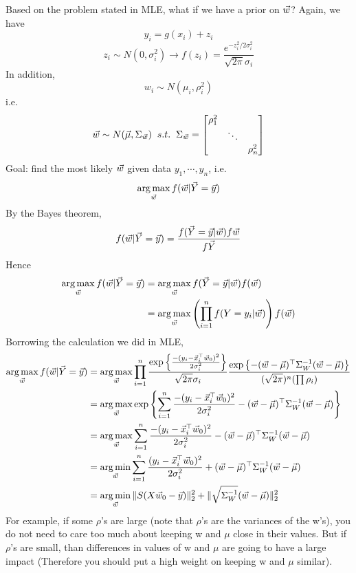 \begin{theorem}
	Based on the problem stated in MLE, what if we have a prior on $\vec{w}$? Again, we have
	\[
y_i = g(x_i)+z_i
	\]
	\[
z_i \sim N(0,\sigma_i^2) \rightarrow f(z_i) = \frac{e^{-z_i^2/2\sigma_i^2}}{\sqrt{2\pi}\sigma_i}
	\]
	In addition,
	\[
w_i \sim N(\mu_i,\rho_i^2)
	\]
	i.e.
	\[
\vec{w} \sim N(\vec{\mu}, \Sigma_{\vec{w}}) \;\; s.t.\;\; \Sigma_{\vec{w}} = \begin{bmatrix}
	\rho_1^2 &&\\
	&\ddots&\\
	&&\rho_n^2
\end{bmatrix}
	\]
	Goal: find the most likely $\vec{w}$ given data $y_1, \cdots, y_n$, i.e.
	\[
\operatorname*{arg\,max}_{\vec{w}} f(\vec{w}|\vec{Y} = \vec{y})
	\]
	By the Bayes theorem,
	\[
	f(\vec{w}|\vec{Y} = \vec{y}) = \frac{f(\vec{Y}=\vec{y}|\vec{w})f{\vec{w}}}{f{\vec{Y}}}
	\]
	Hence
	\begin{align*}
		\operatorname*{arg\,max}_{\vec{w}} f(\vec{w}|\vec{Y} = \vec{y}) &= \operatorname*{arg\,max}_{\vec{w}} f(\vec{Y}=\vec{y}|\vec{w})f(\vec{w})\\
		&= \operatorname*{arg\,max}_{\vec{w}} \left(\prod_{i=1}^nf(Y=y_i|\vec{w})\right)f(\vec{w})
	\end{align*}
	Borrowing the calculation we did in MLE,
	\begin{align*}
		\operatorname*{arg\,max}_{\vec{w}} f(\vec{w}|\vec{Y} = \vec{y}) &= \operatorname*{arg\,max}_{\vec{w}} \prod_{i=1}^n
		\frac{\exp\left\{\frac{-(y_i-\vec{x}_i^\top\vec{w}_0)^2}{2\sigma_i^2}\right\}}{\sqrt{2\pi}\sigma_i}\frac{\exp\left\{-(\vec{w}-\vec{\mu})^\top\Sigma_W^{-1}(\vec{w}-\vec{\mu})\right\}}{(\sqrt{2\pi})^n(\prod\rho_i)}\\
		&= \operatorname*{arg\,max}_{\vec{w}} \exp\left\{\sum_{i=1}^n \frac{-(y_i-\vec{x}_i^\top\vec{w}_0)^2}{2\sigma_i^2} -(\vec{w}-\vec{\mu})^\top\Sigma_W^{-1}(\vec{w}-\vec{\mu}) \right\}\\
		&= \operatorname*{arg\,max}_{\vec{w}} \sum_{i=1}^n \frac{-(y_i-\vec{x}_i^\top\vec{w}_0)^2}{2\sigma_i^2} -(\vec{w}-\vec{\mu})^\top\Sigma_W^{-1}(\vec{w}-\vec{\mu})\\
		&= \operatorname*{arg\,min}_{\vec{w}} \sum_{i=1}^n \frac{(y_i-\vec{x}_i^\top\vec{w}_0)^2}{2\sigma_i^2} +(\vec{w}-\vec{\mu})^\top\Sigma_W^{-1}(\vec{w}-\vec{\mu})\\
		&= \operatorname*{arg\,min}_{\vec{w}} \|S(X\vec{w}_0-\vec{y})\|^2_2 + \|\sqrt{\Sigma_W^{-1}}(\vec{w}-\vec{\mu})\|_2^2
	\end{align*}
	For example, if some $\rho$'s are large (note that $\rho$'s are the variances of the w's), you do not need to care too much about keeping w and $\mu$ close in their values. But if $\rho$'s are small, than differences in values of w and $\mu$ are going to have a large impact (Therefore you should put a high weight on keeping w and $\mu$ similar).

\end{theorem}


